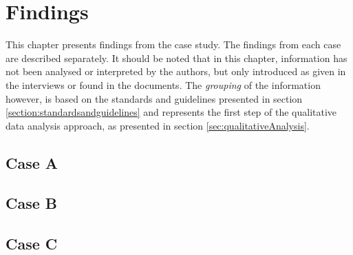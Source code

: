 \chapter{Findings}
\label{chp:findings}
This chapter presents findings from the case study. The findings from each case are described separately. It should be noted that in this chapter, information has not been analysed or interpreted by the authors, but only introduced as given in the interviews or found in the documents. The \textit{grouping} of the information however, is based on the standards and guidelines presented in section \ref{section:standardsandguidelines} and represents the first step of the qualitative data analysis approach, as presented in section \ref{sec:qualitativeAnalysis}. 

\section{Case A}


\section{Case B}


\section{Case C}
